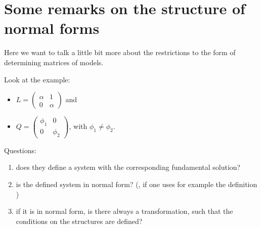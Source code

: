 \chapter{Some remarks on the structure of normal forms}
Here we want to talk a little bit more about the restrictions to the form of
determining matrices of models.

Look at the example:
\begin{itemize}
  \item $L=\begin{pmatrix} \alpha & 1 \\ 0 & \alpha \end{pmatrix}$ and
  \item $Q=\begin{pmatrix} \phi_1 & 0 \\ 0 & \phi_2 \end{pmatrix}$, with
    $\phi_1\neq\phi_2$.
\end{itemize}
Questions:
\begin{enumerate}
  \item does they define a system with the corresponding fundamental solution?
    \checkmark
  \item is the defined system in normal form?
    (\checkmark{}, if one uses for example the definition \cite[p.853]{loday1994})
  \item if it is in normal form, is there always a transformation, such that
    the conditions on the structures are defined?
\end{enumerate}
